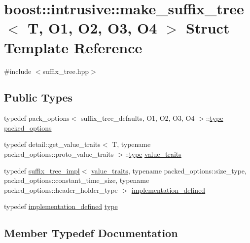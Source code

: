 \hypertarget{structboost_1_1intrusive_1_1make__suffix__tree}{}\section{boost\+:\+:intrusive\+:\+:make\+\_\+suffix\+\_\+tree$<$ T, O1, O2, O3, O4 $>$ Struct Template Reference}
\label{structboost_1_1intrusive_1_1make__suffix__tree}


{\ttfamily \#include $<$suffix\+\_\+tree.\+hpp$>$}

\subsection*{Public Types}
\begin{DoxyCompactItemize}
\item 
typedef pack\+\_\+options$<$ suffix\+\_\+tree\+\_\+defaults, O1, O2, O3, O4 $>$\+::\hyperlink{structboost_1_1intrusive_1_1make__suffix__tree_af7a1a8fa230f6e5be3305bdc0f8287b1}{type} \hyperlink{structboost_1_1intrusive_1_1make__suffix__tree_ad2983281b8c78b0c85e4854e40207ffd}{packed\+\_\+options}
\item 
typedef detail\+::get\+\_\+value\+\_\+traits$<$ T, typename packed\+\_\+options\+::proto\+\_\+value\+\_\+traits $>$\+::\hyperlink{structboost_1_1intrusive_1_1make__suffix__tree_af7a1a8fa230f6e5be3305bdc0f8287b1}{type} \hyperlink{structboost_1_1intrusive_1_1make__suffix__tree_a9274e519ecd5f67199f45a6b29c86c04}{value\+\_\+traits}
\item 
typedef \hyperlink{classboost_1_1intrusive_1_1suffix__tree__impl}{suffix\+\_\+tree\+\_\+impl}$<$ \hyperlink{structboost_1_1intrusive_1_1make__suffix__tree_a9274e519ecd5f67199f45a6b29c86c04}{value\+\_\+traits}, typename packed\+\_\+options\+::size\+\_\+type, packed\+\_\+options\+::constant\+\_\+time\+\_\+size, typename packed\+\_\+options\+::header\+\_\+holder\+\_\+type $>$ \hyperlink{structboost_1_1intrusive_1_1make__suffix__tree_a4f100a03f40c26d5b31299af18214df1}{implementation\+\_\+defined}
\item 
typedef \hyperlink{structboost_1_1intrusive_1_1make__suffix__tree_a4f100a03f40c26d5b31299af18214df1}{implementation\+\_\+defined} \hyperlink{structboost_1_1intrusive_1_1make__suffix__tree_af7a1a8fa230f6e5be3305bdc0f8287b1}{type}
\end{DoxyCompactItemize}


\subsection{Member Typedef Documentation}
\mbox{\label{structboost_1_1intrusive_1_1make__suffix__tree_a4f100a03f40c26d5b31299af18214df1}} 
